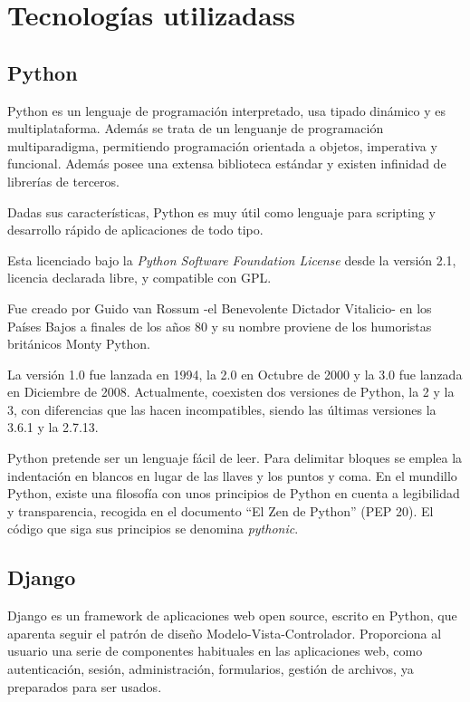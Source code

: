 \section{Tecnologías utilizadass} 
\label{sec:tec_use}

\subsection{Python} 
\label{sec:python}


Python es un lenguaje de programación interpretado, usa tipado dinámico y es multiplataforma. Además se trata de un lenguanje de programación multiparadigma, permitiendo programación orientada a objetos, imperativa y funcional. Además posee una extensa biblioteca estándar y existen infinidad de librerías de terceros.


Dadas sus características, Python es muy útil como lenguaje para scripting y desarrollo rápido de aplicaciones de todo tipo.


Esta licenciado bajo la \textit{Python Software Foundation License} desde la versión 2.1, licencia declarada libre, y compatible con GPL.


Fue creado por Guido van Rossum -el Benevolente Dictador Vitalicio- en los Países Bajos a finales de los años 80 y su nombre proviene de los humoristas británicos Monty Python.


La versión 1.0 fue lanzada en 1994, la 2.0 en Octubre de 2000 y la 3.0 fue lanzada en Diciembre de 2008. Actualmente, coexisten dos versiones de Python, la 2 y la 3, con diferencias que las hacen incompatibles, siendo las últimas versiones la 3.6.1 y la 2.7.13.


Python pretende ser un lenguaje fácil de leer. Para delimitar bloques se emplea la indentación en blancos en lugar de las llaves y los puntos y coma. En el mundillo Python, existe una filosofía  con unos principios de Python en cuenta a legibilidad y transparencia, recogida en el documento ``El Zen de Python'' (PEP 20). El código que siga sus principios se denomina \textit{pythonic}.


\subsection{Django} 
\label{sec:django}


Django es un framework de aplicaciones web open source, escrito en Python, que aparenta seguir el patrón de diseño Modelo-Vista-Controlador. Proporciona al usuario una serie de componentes habituales en las aplicaciones web, como autenticación, sesión, administración, formularios, gestión de archivos, ya preparados para ser usados.


